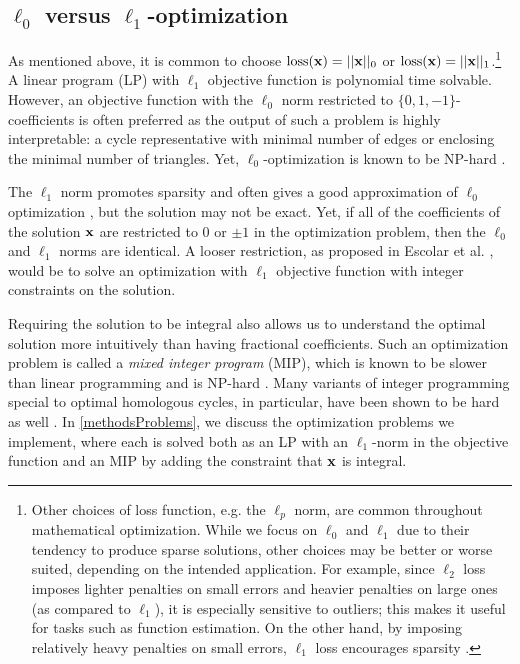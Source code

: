 \subsection{$\ell_0$ versus $\ell_1$-optimization} \label{secl0l1}

As mentioned above, it is common to choose $\mathrm{loss}(\mathbf{x}) = ||\mathbf{x}||_0$ or $\mathrm{loss}(\mathbf{x}) = ||\mathbf{x}||_1$.\footnote{Other choices of loss function, e.g. the $\ell_p$ norm, are common throughout mathematical optimization.  While we focus on $\ell_0$ and $\ell_1$ due to their tendency to produce sparse solutions, other choices may be better or worse suited, depending on the intended application.  For example, since $\ell_2$ loss  imposes lighter penalties on small errors and heavier penalties on large ones (as compared to $\ell_1$), it is especially sensitive to outliers; this makes it useful for tasks such as function estimation.  On the other hand, by imposing relatively heavy penalties on small errors, $\ell_1$ loss encourages sparsity \cite{dohono,NPhardL0}.} A linear program (LP) with $\ell_1$ objective function is polynomial time solvable. However, an objective function with the $\ell_0$ norm restricted to $\{0,1,-1\}$-coefficients is often preferred as the output of such a problem is highly interpretable: a cycle representative with minimal number of edges or enclosing the minimal number of triangles. Yet, $\ell_0$-optimization is known to be NP-hard \cite{NPhardL0}. 


The  $\ell_1$ norm promotes sparsity and often gives a good approximation of $\ell_0$ optimization \cite{dohono,NPhardL0}, but the solution may not be exact. Yet, if all of the coefficients of the solution $\mathbf{x}$ are restricted to $0$ or $\pm 1$ in the optimization problem, then the $\ell_0$ and $\ell_1$ norms are identical. A looser restriction, as proposed in Escolar et al. \cite{Escolar2016}, would be to solve an optimization with $\ell_1$ objective function with integer constraints on the solution. 


Requiring the solution to be integral also allows us to understand the optimal solution more intuitively than having fractional coefficients. Such an optimization problem is called a \textit{mixed integer program} (MIP), which is known to be slower than linear programming and is NP-hard \cite{Obayashi2018}. Many variants of integer programming special to optimal homologous cycles, in particular, have been shown to be hard as well \cite{borradaile2020minimum}. In \se \ref{methodsProblems}, we discuss the optimization problems we implement, where each is solved both as an LP with an $\ell_1$-norm in the objective function and an MIP by adding the constraint that $\mathbf{x}$ is integral. 


